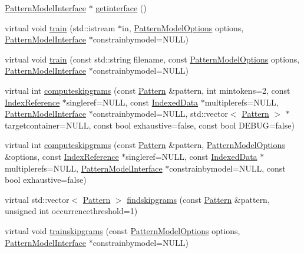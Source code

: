 \begin{DoxyCompactItemize}
\item 
\hyperlink{classPatternModelInterface}{Pattern\+Model\+Interface} $\ast$ \hyperlink{classPatternModel_a837bdbf478b7ea8a51ad674418926175}{getinterface} ()
\item 
virtual void \hyperlink{classPatternModel_ac1e8a9a955f8da64abe95179482a6b55}{train} (std\+::istream $\ast$in, \hyperlink{classPatternModelOptions}{Pattern\+Model\+Options} options, \hyperlink{classPatternModelInterface}{Pattern\+Model\+Interface} $\ast$constrainbymodel=N\+U\+L\+L)
\item 
virtual void \hyperlink{classPatternModel_ac2390acee4c9aeecf1bce2d0b312bb4c}{train} (const std\+::string filename, const \hyperlink{classPatternModelOptions}{Pattern\+Model\+Options} options, \hyperlink{classPatternModelInterface}{Pattern\+Model\+Interface} $\ast$constrainbymodel=N\+U\+L\+L)
\item 
virtual int \hyperlink{classPatternModel_aa8a7898c399c670792af12f509adcd28}{computeskipgrams} (const \hyperlink{classPattern}{Pattern} \&pattern, int mintokens=2, const \hyperlink{classIndexReference}{Index\+Reference} $\ast$singleref=N\+U\+L\+L, const \hyperlink{classIndexedData}{Indexed\+Data} $\ast$multiplerefs=N\+U\+L\+L, \hyperlink{classPatternModelInterface}{Pattern\+Model\+Interface} $\ast$constrainbymodel=N\+U\+L\+L, std\+::vector$<$ \hyperlink{classPattern}{Pattern} $>$ $\ast$targetcontainer=N\+U\+L\+L, const bool exhaustive=false, const bool D\+E\+B\+U\+G=false)
\item 
virtual int \hyperlink{classPatternModel_a00b3338b6e79a3dbc9b5f95cb0171494}{computeskipgrams} (const \hyperlink{classPattern}{Pattern} \&pattern, \hyperlink{classPatternModelOptions}{Pattern\+Model\+Options} \&options, const \hyperlink{classIndexReference}{Index\+Reference} $\ast$singleref=N\+U\+L\+L, const \hyperlink{classIndexedData}{Indexed\+Data} $\ast$multiplerefs=N\+U\+L\+L, \hyperlink{classPatternModelInterface}{Pattern\+Model\+Interface} $\ast$constrainbymodel=N\+U\+L\+L, const bool exhaustive=false)
\item 
virtual std\+::vector$<$ \hyperlink{classPattern}{Pattern} $>$ \hyperlink{classPatternModel_aa4aa18a4d9e7554a3c798872e915e8a0}{findskipgrams} (const \hyperlink{classPattern}{Pattern} \&pattern, unsigned int occurrencethreshold=1)
\item 
virtual void \hyperlink{classPatternModel_acd4e0ecc0e796c894b994859b2c5ffb6}{trainskipgrams} (const \hyperlink{classPatternModelOptions}{Pattern\+Model\+Options} options, \hyperlink{classPatternModelInterface}{Pattern\+Model\+Interface} $\ast$constrainbymodel=N\+U\+L\+L)

\end{DoxyCompactItemize}

